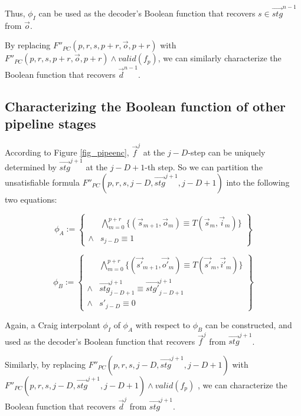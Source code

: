 \documentclass[runningheads,a4paper,orivec]{llncs}
\begin{document}
Thus,
$\phi_I$ can be used as the decoder's Boolean function that recovers $s\in \vec{stg}^{n-1}$ from $\vec{o}$.

By replacing $F''_{PC}(p,r,s,p+r,\vec{o},p+r)$ with $F''_{PC}(p,r,s,p+r,\vec{o},p+r)\wedge valid(f_p)$,
we can similarly characterize the Boolean function that recovers $\vec{d}^{n-1}$.

\subsection{Characterizing the Boolean function of other pipeline stages}
According to Figure \ref{fig_pipeenc},
$\vec{f}^j$ at the $j-D$-step can be uniquely determined by $\vec{stg}^{j+1}$ at the $j-D+1$-th step.
So we can partition the unsatisfiable formula $F''_{PC}(p,r,s,j-D,\vec{stg}^{j+1},j-D+1)$ 
 into the following two equations:

\begin{equation}
 \phi_A := 
 \left\{
\begin{array}{cc}
&\bigwedge_{m=0}^{p+r}
\{
(\vec{s}_{m+1},\vec{o}_m)\equiv T(\vec{s}_m,\vec{i}_m)
\}
\\
\wedge& s_{j-D}\equiv 1 
\end{array}
\right\}
\end{equation}

\begin{equation}
\phi_B := 
\left\{
\begin{array}{cc}
&\bigwedge_{m=0}^{p+r}
\{
(\vec{s'}_{m+1},\vec{o'}_m)\equiv T(\vec{s'}_m,\vec{i'}_m)
\}
\\
\wedge&\vec{stg}^{j+1}_{j-D+1}\equiv \vec{stg'}^{j+1}_{j-D+1} \\
\wedge& s'_{j-D}\equiv 0 
\end{array}
\right\}
\end{equation}

Again,
a Craig interpolant $\phi_I$ of $\phi_A$ with respect to $\phi_B$ can be constructed,
and used as the decoder's Boolean function that recovers $\vec{f}^{j}$ from $\vec{stg}^{j+1}$.

Similarly,
by replacing $F''_{PC}(p,r,s,j-D,\vec{stg}^{j+1},j-D+1)$  with 
$F''_{PC}(p,r,s,j-D,\vec{stg}^{j+1},j-D+1)\wedge valid(f_p)$ ,
we can characterize the Boolean function that recovers $\vec{d}^{j}$ from $\vec{stg}^{j+1}$.
\end{document}
